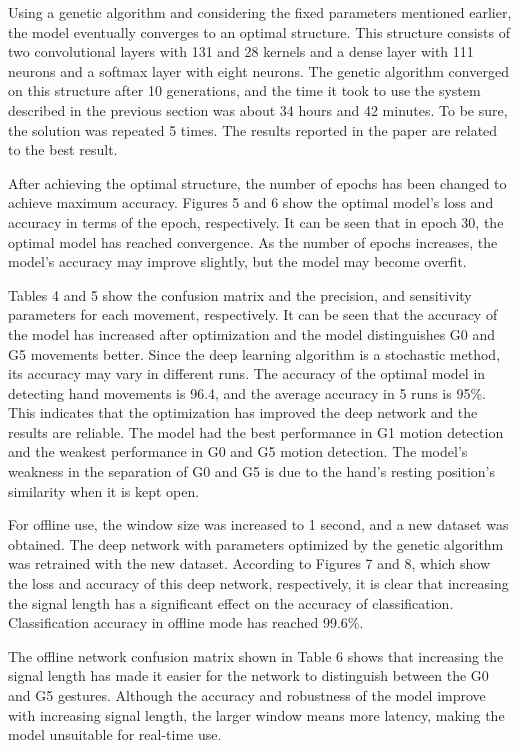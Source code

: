 Using a genetic algorithm and considering the fixed parameters mentioned earlier, the model eventually converges to an optimal structure. This structure consists of two convolutional layers with 131 and 28 kernels and a dense layer with 111 neurons and a softmax layer with eight neurons. The genetic algorithm converged on this structure after 10 generations, and the time it took to use the system described in the previous section was about 34 hours and 42 minutes. To be sure, the solution was repeated 5 times. The results reported in the paper are related to the best result.

After achieving the optimal structure, the number of epochs has been changed to achieve maximum accuracy. Figures 5 and 6 show the optimal model's loss and accuracy in terms of the epoch, respectively. It can be seen that in epoch 30, the optimal model has reached convergence. As the number of epochs increases, the model's accuracy may improve slightly, but the model may become overfit.

Tables 4 and 5 show the confusion matrix and the precision, and sensitivity parameters for each movement, respectively. It can be seen that the accuracy of the model has increased after optimization and the model distinguishes G0 and G5 movements better. Since the deep learning algorithm is a stochastic method, its accuracy may vary in different runs. The accuracy of the optimal model in detecting hand movements is 96.4, and the average accuracy in 5 runs is 95\%. This indicates that the optimization has improved the deep network and the results are reliable. The model had the best performance in G1 motion detection and the weakest performance in G0 and G5 motion detection. The model's weakness in the separation of G0 and G5 is due to the hand's resting position's similarity when it is kept open.

For offline use, the window size was increased to 1 second, and a new dataset was obtained. The deep network with parameters optimized by the genetic algorithm was retrained with the new dataset. According to Figures 7 and 8, which show the loss and accuracy of this deep network, respectively, it is clear that increasing the signal length has a significant effect on the accuracy of classification. Classification accuracy in offline mode has reached 99.6\%. 

The offline network confusion matrix shown in Table 6 shows that increasing the signal length has made it easier for the network to distinguish between the G0 and G5 gestures. Although the accuracy and robustness of the model improve with increasing signal length, the larger window means more latency, making the model unsuitable for real-time use.



